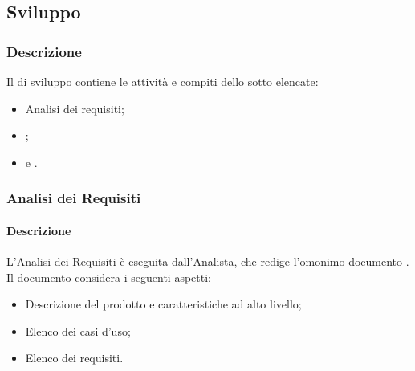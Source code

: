 \subsection{Sviluppo}\label{sviluppo}

\subsubsection{Descrizione}
Il  di sviluppo contiene le attività e compiti dello  sotto elencate:
\begin{itemize}
  \item Analisi dei requisiti;
  \item {};
  \item {} e .
\end{itemize}


\subsubsection{Analisi dei Requisiti}\label{analisi}
\paragraph{Descrizione}
L'Analisi dei Requisiti è eseguita dall'Analista, che redige l'omonimo documento \AdR. Il documento considera i seguenti aspetti:
\begin{itemize}
  \item Descrizione del prodotto e caratteristiche ad alto livello;
  \item Elenco dei casi d'uso;
  \item Elenco dei requisiti.
\end{itemize}

